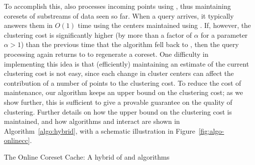 To accomplish this, \hybrid also processes incoming points using \cc, thus
maintaining coresets of substreams of data seen so far. When a query arrives, it
typically answers them in $O(1)$ time using the centers maintained using
\seqkm. If, however, the clustering cost is significantly higher (by more than a
factor of $\alpha$ for a parameter $\alpha > 1$) than the previous time that the
algorithm fell back to \cc, then the query processing again returns to \cc to
regenerate a coreset. One difficulty in implementing this idea is that
(efficiently) maintaining an estimate of the current clustering cost is not
easy, since each change in cluster centers can affect the contribution of a
number of points to the clustering cost. To reduce the cost of maintenance, our
algorithm keeps an upper bound on the clustering cost; as we show further, this
is sufficient to give a provable guarantee on the quality of clustering. Further
details on how the upper bound on the clustering cost is maintained, and how
algorithms \seqkm and \cc interact are shown in Algorithm~\ref{algo:hybrid}, 
with a schematic illustration in Figure~\ref{fig:algo-onlinecc}.


\begin{algorithm}[t]
\label{algo:hybrid}
\caption{The Online Coreset Cache: A hybrid of \cc and \seqkm algorithms}



\end{algorithm}

